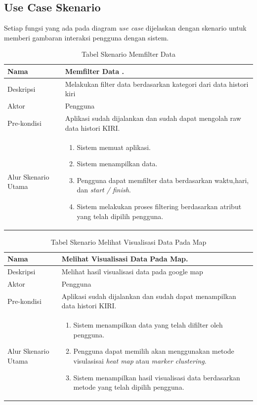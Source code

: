 \subsection{Use Case Skenario}
Setiap fungsi yang ada pada diagram \textit{use case} dijelaskan dengan skenario untuk memberi gambaran interaksi pengguna dengan sistem.
\begin{table}[H]
    \centering
    \caption{Tabel Skenario Memfilter Data }
    \begin{tabular}{|p{3cm}|p{10cm}|}
    \hline
        Nama & Memfilter Data .\\
    \hline
    \hline
        Deskripsi & Melakukan filter data berdasarkan kategori dari data histori kiri \\
    \hline
        Aktor & Pengguna \\
    \hline
        Pre-kondisi & Aplikasi sudah dijalankan dan sudah dapat mengolah raw data histori KIRI.\\
    \hline
        Alur Skenario Utama & 
        \begin{enumerate}
            \item Sistem memuat aplikasi.
            \item Sistem menampilkan data.
            \item Pengguna  dapat memfilter data berdasarkan waktu,hari, dan \textit{start / finish}.
            \item Sistem melakukan proses filtering berdasarkan atribut yang telah dipilih pengguna.
        \end{enumerate}\\
    \hline
    \end{tabular}
    \label{tab:skenario1}
\end{table}


\begin{table}[H]
    \centering
    \caption{Tabel Skenario Melihat Visualisasi Data Pada Map }
    \begin{tabular}{|p{3cm}|p{10cm}|}
    \hline
        Nama & Melihat Visualisasi Data Pada Map.\\
    \hline
    \hline
        Deskripsi & Melihat hasil visualisasi data pada google map  \\
    \hline
        Aktor & Pengguna \\
    \hline
        Pre-kondisi & Aplikasi sudah dijalankan dan sudah dapat menampilkan data histori KIRI.\\
    \hline
        Alur Skenario Utama & 
        \begin{enumerate}
            \item Sistem menampilkan data yang telah difilter oleh pengguna.
             \item Pengguna  dapat memilih akan menggunakan metode visulasisai \textit{heat map} atau \textit{marker clustering}.
            \item Sistem menampilkan hasil visualisasi data berdasarkan metode yang telah dipilih pengguna.
        \end{enumerate}\\
    \hline
    \end{tabular}
    \label{tab:skenario1}
\end{table}

